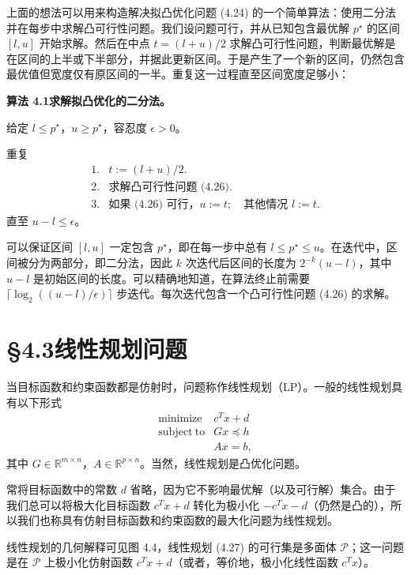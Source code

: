 \documentclass[UTF8,12pt,a4paper,fontset=fandol]{ctexart}
\begin{document}
上面的想法可以用来构造解决拟凸优化问题 (4.24) 的一个简单算法：使用二分法并在每步中求解凸可行性问题。我们设问题可行，并从已知包含最优解 $p^\star$ 的区间 $[l,u]$ 开始求解。然后在中点 $t=(l+u)/2$ 求解凸可行性问题，判断最优解是在区间的上半或下半部分，并据此更新区间。于是产生了一个新的区间，仍然包含最优值但宽度仅有原区间的一半。重复这一过程直至区间宽度足够小：

\noindent\textbf{算法 4.1\quad 求解拟凸优化的二分法。}

给定 $l\leq p^\star$，$u\geq p^\star$，容忍度 $\epsilon>0$。

重复
\[
\begin{array}{ll}
1. & t:=(l+u)/2.\\
2. & \text{求解凸可行性问题 (4.26).}\\
3. & \text{如果 (4.26) 可行，}u:=t;\quad \text{其他情况 }l:=t.
\end{array}
\]
直至 $u-l\leq\epsilon$。

可以保证区间 $[l,u]$ 一定包含 $p^\star$，即在每一步中总有 $l\leq p^\star\leq u$。在迭代中，区间被分为两部分，即二分法，因此 $k$ 次迭代后区间的长度为 $2^{-k}(u-l)$，其中 $u-l$ 是初始区间的长度。可以精确地知道，在算法终止前需要 $\lceil\log_2((u-l)/\epsilon)\rceil$ 步迭代。每次迭代包含一个凸可行性问题 (4.26) 的求解。

\section*{§4.3\quad 线性规划问题}

当目标函数和约束函数都是仿射时，问题称作线性规划（LP）。一般的线性规划具有以下形式
\begin{equation}
\begin{array}{ll}
\mathop{\mathrm{minimize}} & c^Tx+d\\
\mathrm{subject\ to} & Gx\preceq h\\
& Ax=b,
\end{array}
\tag{4.27}
\end{equation}
其中 $G\in\mathbb{R}^{m\times n}$，$A\in\mathbb{R}^{p\times n}$。当然，线性规划是凸优化问题。

常将目标函数中的常数 $d$ 省略，因为它不影响最优解（以及可行解）集合。由于我们总可以将极大化目标函数 $c^Tx+d$ 转化为极小化 $-c^Tx-d$（仍然是凸的），所以我们也称具有仿射目标函数和约束函数的最大化问题为线性规划。

线性规划的几何解释可见图 4.4，线性规划 (4.27) 的可行集是多面体 $\mathcal{P}$；这一问题是在 $\mathcal{P}$ 上极小化仿射函数 $c^Tx+d$（或者，等价地，极小化线性函数 $c^Tx$）。
\end{document}

